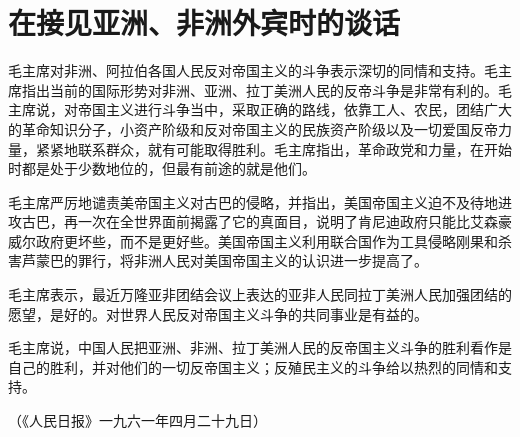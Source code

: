 \section[在接见亚洲、非洲外宾时的谈话（一九六一年四月二十八日）]{在接见亚洲、非洲外宾时的谈话}

毛主席对非洲、阿拉伯各国人民反对帝国主义的斗争表示深切的同情和支持。毛主席指出当前的国际形势对非洲、亚洲、拉丁美洲人民的反帝斗争是非常有利的。毛主席说，对帝国主义进行斗争当中，采取正确的路线，依靠工人、农民，团结广大的革命知识分子，小资产阶级和反对帝国主义的民族资产阶级以及一切爱国反帝力量，紧紧地联系群众，就有可能取得胜利。毛主席指出，革命政党和力量，在开始时都是处于少数地位的，但最有前途的就是他们。

毛主席严厉地谴责美帝国主义对古巴的侵略，并指出，美国帝国主义迫不及待地进攻古巴，再一次在全世界面前揭露了它的真面目，说明了肯尼迪政府只能比艾森豪威尔政府更坏些，而不是更好些。美国帝国主义利用联合国作为工具侵略刚果和杀害芦蒙巴的罪行，将非洲人民对美国帝国主义的认识进一步提高了。

毛主席表示，最近万隆亚非团结会议上表达的亚非人民同拉丁美洲人民加强团结的愿望，是好的。对世界人民反对帝国主义斗争的共同事业是有益的。

毛主席说，中国人民把亚洲、非洲、拉丁美洲人民的反帝国主义斗争的胜利看作是自己的胜利，并对他们的一切反帝国主义；反殖民主义的斗争给以热烈的同情和支持。

{\raggedleft（《人民日报》一九六一年四月二十九日）\par}


